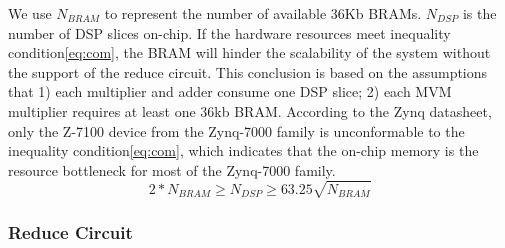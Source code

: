 We use $N_{BRAM}$ to represent the number of available 36Kb BRAMs. $N_{DSP}$ is the number of DSP slices on-chip. If the hardware resources meet inequality condition\cref{eq:com}, the BRAM will hinder the scalability of the system without the support of the reduce circuit. This conclusion is based on the assumptions that 1) each multiplier and adder consume one DSP slice; 2) each MVM multiplier requires at least one 36kb BRAM.
According to the Zynq datasheet, only the Z-7100 device from the Zynq-7000 family is unconformable to the inequality condition\cref{eq:com}, which indicates that the on-chip memory is the resource bottleneck for most of the Zynq-7000 family.
\begin{equation}
\label{eq:com}
2*N_{BRAM}\geq N_{DSP}\geq 63.25\sqrt{N_{BRAM}}
\end{equation}

%
%

\subsubsection{Reduce Circuit}

